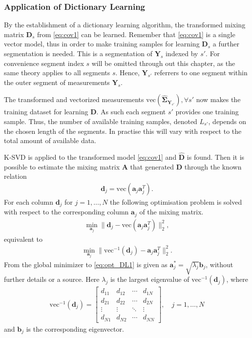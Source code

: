 \subsubsection{Application of Dictionary Learning}
By the establishment of a dictionary learning algorithm, the transformed mixing matrix $\mathbf{D}_s$ from \eqref{eq:cov1} can be learned. 
Remember that \eqref{eq:cov1} is a single vector model, thus in order to make training samples for learning $\mathbf{D}_s$ a further segmentation is needed.
This is a segmentation of $\mathbf{Y}_s$ indexed by $s'$. 
For convenience segment index $s$ will be omitted through out this chapter, as the same theory applies to all segments $s$.
Hence, $\mathbf{Y}_{s'}$ referrers to one segment within the outer segment of measurements $\mathbf{Y}_s$. 
   
The transformed and vectorized measurements $\text{vec} \left( \widehat{\boldsymbol{\Sigma}}_{\mathbf{Y}_{s'}} \right), \forall s'$ now makes the training dataset for learning $\mathbf{D}$. 
As such each segment $s'$ provides one training sample.   
Thus, the number of available training samples, denoted $L_{s'}$, depends on the chosen length of the segments. In practise this will vary with respect to the total amount of available data. 

K-SVD is applied to the transformed model \eqref{eq:cov1} and $\hat{\mathbf{D}}$ is found. Then it is possible to estimate the mixing matrix $\mathbf{A}$ that generated $\mathbf{D}$ through the known relation 
\begin{align*}
\mathbf{d}_j = \text{vec}(\mathbf{a}_j \mathbf{a}_j^T).
\end{align*}
For each column $\mathbf{d}_j$ for $j = 1, \dots, N$ the following optimisation problem is solved with respect to the corresponding column $\mathbf{a}_j$ of the mixing matrix.
\begin{align*}
\min_{\mathbf{a}_j} \| \mathbf{d}_j -\text{vec}\left(\mathbf{a}_j \mathbf{a}_j^T\right) \|_2^2, 
\end{align*}
equivalent to 
\begin{align}
\min_{\mathbf{a}_j} \| \text{vec}^{-1}(\mathbf{d}_j) - \mathbf{a}_j \mathbf{a}_j^T\|_2^2. \label{eq:opt_DL1}
\end{align}
From \cite{Balkan2015} the global minimizer to \eqref{eq:opt_DL1} is given as $\mathbf{a}^{\ast}_j=\sqrt{\lambda_j} \mathbf{b}_j$, without further details or a source.  
Here $\lambda_j$ is the largest eigenvalue of $\text{vec}^{-1}(\mathbf{d}_j)$, where
\begin{align*}
\text{vec}^{-1}(\mathbf{d}_j) = 
\begin{bmatrix}
d_{11} & d_{12} & \cdots & d_{1N} \\
d_{21} & d_{22} & \cdots & d_{2N} \\
\vdots & \vdots & \ddots & \vdots \\
d_{N1} & d_{N2} & \cdots & d_{NN}
\end{bmatrix}, \quad j =1, \dots, N
\end{align*}
and $\mathbf{b}_j$ is the corresponding eigenvector.

